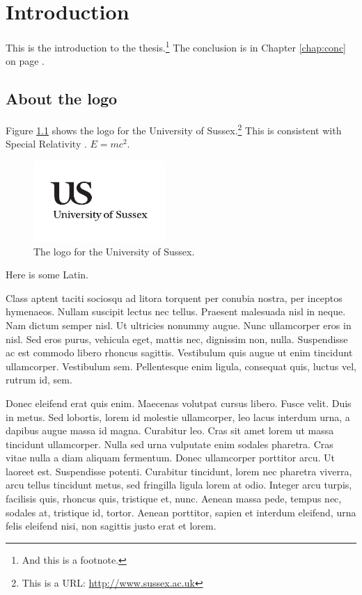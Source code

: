 \chapter{Introduction}
\label{chap:intro}

This is the introduction to the thesis.\footnote{And this is a footnote.}  The conclusion is in Chapter \ref{chap:conc} on page \pageref{chap:conc}.

\section{About the logo}

Figure \ref{us_figure} shows the logo for the University of Sussex.\footnote{This is a URL: \url{http://www.sussex.ac.uk}} This is consistent with Special Relativity \citep{Einstein1905}. $E=mc^2$.

\begin{figure}
\centering
\includegraphics[width=5cm]{uslogo}
\caption[US Logo (optional short caption)]{\label{us_figure} The logo for the University of Sussex.}
\end{figure}

Here is some Latin.

Class aptent taciti sociosqu ad litora torquent per conubia nostra, per inceptos hymenaeos. Nullam suscipit lectus nec tellus. Praesent malesuada nisl in neque. Nam dictum semper nisl. Ut ultricies nonummy augue. Nunc ullamcorper eros in nisl. Sed eros purus, vehicula eget, mattis nec, dignissim non, nulla. Suspendisse ac est commodo libero rhoncus sagittis. Vestibulum quis augue ut enim tincidunt ullamcorper. Vestibulum sem. Pellentesque enim ligula, consequat quis, luctus vel, rutrum id, sem.

Donec eleifend erat quis enim. Maecenas volutpat cursus libero. Fusce velit. Duis in metus. Sed lobortis, lorem id molestie ullamcorper, leo lacus interdum urna, a dapibus augue massa id magna. Curabitur leo. Cras sit amet lorem ut massa tincidunt ullamcorper. Nulla sed urna vulputate enim sodales pharetra. Cras vitae nulla a diam aliquam fermentum. Donec ullamcorper porttitor arcu. Ut laoreet est. Suspendisse potenti. Curabitur tincidunt, lorem nec pharetra viverra, arcu tellus tincidunt metus, sed fringilla ligula lorem at odio. Integer arcu turpis, facilisis quis, rhoncus quis, tristique et, nunc. Aenean massa pede, tempus nec, sodales at, tristique id, tortor. Aenean porttitor, sapien et interdum eleifend, urna felis eleifend nisi, non sagittis justo erat et lorem.

